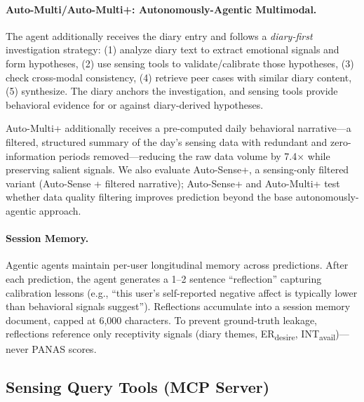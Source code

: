 \documentclass[screen,review,anonymous]{acmart}
\newcommand{\erdesire}{ER\textsubscript{desire}}
\newcommand{\intavail}{INT\textsubscript{avail}}
\begin{document}
\paragraph{Auto-Multi/Auto-Multi+: Autonomously-Agentic Multimodal.}
The agent additionally receives the diary entry and follows a \emph{diary-first} investigation strategy: (1) analyze diary text to extract emotional signals and form hypotheses, (2) use sensing tools to validate/calibrate those hypotheses, (3) check cross-modal consistency, (4) retrieve peer cases with similar diary content, (5) synthesize. The diary anchors the investigation, and sensing tools provide behavioral evidence for or against diary-derived hypotheses.

Auto-Multi+ additionally receives a pre-computed daily behavioral narrative---a filtered, structured summary of the day's sensing data with redundant and zero-information periods removed---reducing the raw data volume by 7.4$\times$ while preserving salient signals. We also evaluate Auto-Sense+, a sensing-only filtered variant (Auto-Sense + filtered narrative); Auto-Sense+ and Auto-Multi+ test whether data quality filtering improves prediction beyond the base autonomously-agentic approach.



\paragraph{Session Memory.}
Agentic agents maintain per-user longitudinal memory across predictions. After each prediction, the agent generates a 1--2 sentence ``reflection'' capturing calibration lessons (e.g., ``this user's self-reported negative affect is typically lower than behavioral signals suggest''). Reflections accumulate into a session memory document, capped at 6,000 characters. To prevent ground-truth leakage, reflections reference only receptivity signals (diary themes, \erdesire{}, \intavail{})---never PANAS scores.

\subsection{Sensing Query Tools (MCP Server)}
\label{sec:tools}
\end{document}
